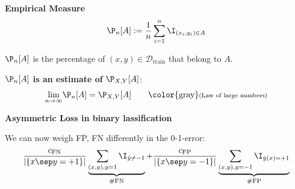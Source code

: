  \textbf{Empirical Measure}\\
$$
    \P_n[A] := \frac{1}{n}\sum_{i=1}^{n}\I_{(x_i,y_i) \in A}
$$

$\P_n[A]$ is the percentage of $(x,y) \in \mathcal{D}_\text{train}$ that belong to $A$.

\lemma $\P_n[A]$ \textbf{is an estimate of} $\P_{X,Y}[A]$:
$$
    \underset{n\to\infty}{\lim} \P_n[A] = \P_{X,Y}[A] \qquad \text{\color{gray}\scriptsize (Law of large numbers)}
$$

\remark \textbf{Asymmetric Loss in binary lassification}

We can now weigh FP, FN differently in the 0-1-error:
{\small
$$
    \frac{c_\text{FN}}{|\{ x \sep y=+1 \}|} \underbrace{\sum_{(x,y), y=1} \I_{\hat{y}\neq -1}}_\text{\#FN} + \frac{c_\text{FP}}{|\{x \sep y =-1 \}|}\underbrace{\sum_{(x,y), y=-1} \I_{\hat{y}(x)=+1}}_\text{\#FP}
$$
}
